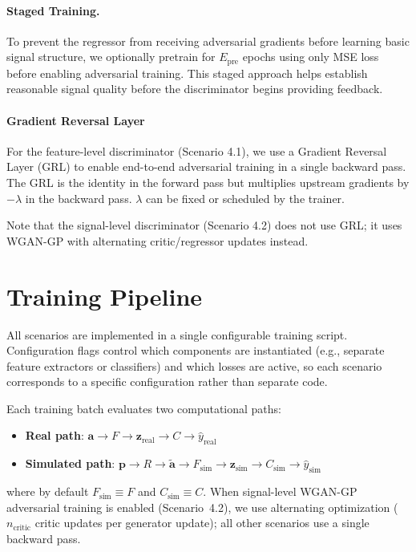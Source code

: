 \paragraph{Staged Training.} To prevent the regressor from receiving adversarial gradients before learning basic signal structure, we optionally pretrain for $E_{\text{pre}}$ epochs using only MSE loss before enabling adversarial training. This staged approach helps establish reasonable signal quality before the discriminator begins providing feedback.

\paragraph{Gradient Reversal Layer}
For the feature-level discriminator (Scenario 4.1), we use a Gradient Reversal Layer (GRL) \cite{ganin2016domain} to enable end-to-end adversarial training in a single backward pass. The GRL is the identity in the forward pass but multiplies upstream gradients by $-\lambda$ in the backward pass. $\lambda$ can be fixed or scheduled by the trainer.

Note that the signal-level discriminator (Scenario 4.2) does not use GRL; it uses WGAN-GP with alternating critic/regressor updates instead.

\section{Training Pipeline}
\label{sec:pipeline}

All scenarios are implemented in a single configurable training script. Configuration flags control which components are instantiated (e.g., separate feature extractors or classifiers) and which losses are active, so each scenario corresponds to a specific configuration rather than separate code.

Each training batch evaluates two computational paths:
\begin{itemize}
    \item \textbf{Real path}: $\mathbf{a} \rightarrow F \rightarrow \mathbf{z}_{\text{real}} \rightarrow C \rightarrow \hat{y}_{\text{real}}$
    \item \textbf{Simulated path}: $\mathbf{p} \rightarrow R \rightarrow \tilde{\mathbf{a}} \rightarrow F_{\text{sim}} \rightarrow \mathbf{z}_{\text{sim}} \rightarrow C_{\text{sim}} \rightarrow \hat{y}_{\text{sim}}$
\end{itemize}
where by default $F_{\text{sim}} \equiv F$ and $C_{\text{sim}} \equiv C$. When signal-level WGAN-GP adversarial training is enabled (Scenario~4.2), we use alternating optimization ($n_{\text{critic}}$ critic updates per generator update); all other scenarios use a single backward pass.

